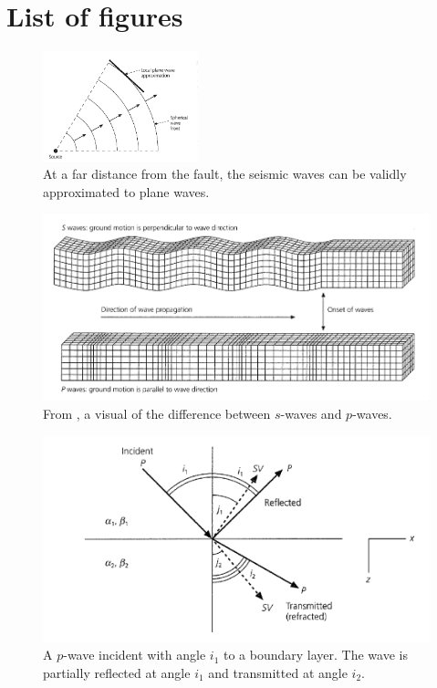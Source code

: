 \chapter{List of figures}
\begin{figure}[ht] %
    \centering
    \includegraphics[width=0.4\textwidth]{assets/plane.png}
    \caption{At a far distance from the fault, the seismic waves can be validly approximated to plane waves.\cite{stein2009introduction}}
    \label{fig:plane}
\end{figure}

\begin{figure}
    \centering
    \includegraphics[width=\textwidth]{assets/s-p-waves.png}
    \caption{From \cite[Fig 2.4-3]{stein2009introduction}, a visual of the difference between $s$-waves and $p$-waves.}
    \label{fig:spwaves}
\end{figure}

\begin{figure}[ht]
    \centering
    \includegraphics[width=.9\textwidth]
    {assets/pwave-reflected.PNG}
    \caption{A $p$-wave incident with angle $i_1$ to a boundary layer. The wave is partially reflected at angle $i_1$ and transmitted at angle $i_2$.\cite[Figure 2.5-5]{stein2009introduction}}
    \label{fig:reflection}
\end{figure}